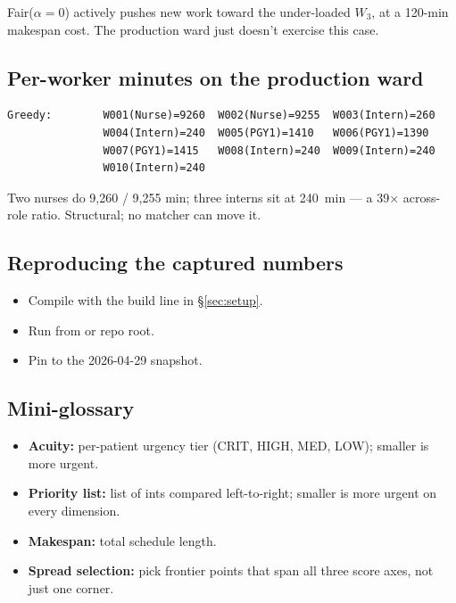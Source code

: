 \noindent
Fair($\alpha\!=\!0$) actively pushes new work toward the under-loaded
$W_3$, at a 120-min makespan cost. The production ward just doesn't
exercise this case.

\subsection{Per-worker minutes on the production ward}

\begin{lstlisting}[basicstyle=\ttfamily\footnotesize,numbers=none,frame=single,
                   backgroundcolor=\color{boxbg}]
Greedy:        W001(Nurse)=9260  W002(Nurse)=9255  W003(Intern)=260
               W004(Intern)=240  W005(PGY1)=1410   W006(PGY1)=1390
               W007(PGY1)=1415   W008(Intern)=240  W009(Intern)=240
               W010(Intern)=240
\end{lstlisting}

\noindent
Two nurses do 9{,}260 / 9{,}255 min; three interns sit at 240~min ---
a 39$\times$ across-role ratio. Structural; no matcher can move it.

\subsection{Reproducing the captured numbers}

\begin{itemize}
  \item Compile with the build line in \S\ref{sec:setup}.
  \item Run from  or repo root.
  \item Pin  to the 2026-04-29 snapshot.
\end{itemize}

\subsection{Mini-glossary}

\begin{itemize}
  \item \textbf{Acuity:} per-patient urgency tier (CRIT, HIGH,
        MED, LOW); smaller is more urgent.
  \item \textbf{Priority list:} list of ints compared left-to-right;
        smaller is more urgent on every dimension.
  \item \textbf{Makespan:} total schedule length.
  \item \textbf{Spread selection:} pick frontier points that span
        all three score axes, not just one corner.
\end{itemize}
